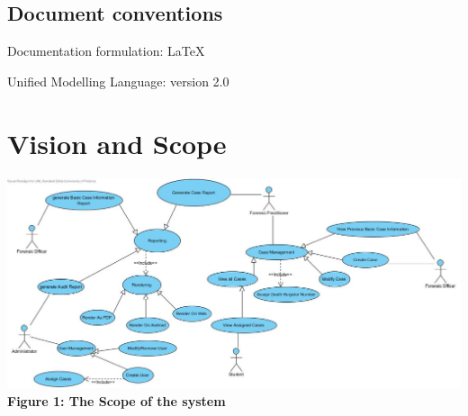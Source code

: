 \documentclass[10pt,a4paper]{article}
\begin{document}
\subsection{Document conventions}
\begin{description}
\item Documentation formulation: LaTeX
\item Unified Modelling Language: version 2.0
\end{description}

\section{Vision and Scope}

\begin{center}
\includegraphics[scale=0.5]{DRUC.jpg}
\textbf{Figure 1: The Scope of the system}
\end{center}
\end{document}
